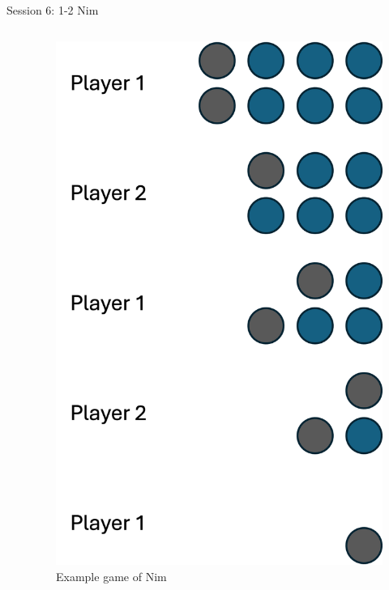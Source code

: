 \documentclass{beamer}  %
\begin{document}
\begin{frame}{Session 6: 1-2 Nim}
\begin{columns}
\begin{itemize}
            \end{itemize}
        \begin{figure}
            \includegraphics[scale = 0.45]{Images/1-2Nim_example.png}
            \caption{Example game of Nim}
        \end{figure}
    \end{columns}
\end{frame}
\end{document}
